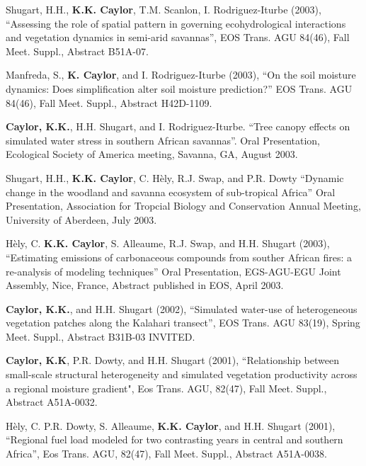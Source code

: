 \documentclass[10pt]{report}
\begin{document}
\begin{etaremune}
\item Shugart, H.H., \textbf{K.K. Caylor}, T.M. Scanlon, I. Rodriguez-Iturbe (2003),  ``Assessing the role of spatial pattern in governing ecohydrological interactions and vegetation dynamics in semi-arid savannas'', EOS Trans. AGU 84(46), Fall Meet. Suppl., Abstract B51A-07.

\item Manfreda, S., \textbf{K. Caylor}, and I. Rodriguez-Iturbe (2003), ``On the soil moisture dynamics: Does simplification alter soil moisture prediction?'' EOS Trans. AGU 84(46), Fall Meet. Suppl., Abstract H42D-1109.

\item \textbf{Caylor, K.K.}, H.H. Shugart, and I. Rodriguez-Iturbe. ``Tree canopy effects on simulated water stress in southern African savannas''. Oral Presentation, Ecological Society of America meeting, Savanna, GA, August 2003.

\item Shugart, H.H., \textbf{K.K. Caylor}, C. H\`ely, R.J. Swap, and P.R. Dowty ``Dynamic change in the woodland and savanna ecosystem of sub-tropical Africa'' Oral Presentation, Association for Tropcial Biology and Conservation Annual Meeting, University of Aberdeen, July 2003.

\item H\`ely, C. \textbf{K.K. Caylor}, S. Alleaume, R.J. Swap, and H.H. Shugart (2003), ``Estimating emissions of carbonaceous compounds from souther African fires: a re-analysis of modeling techniques'' Oral Presentation, EGS-AGU-EGU Joint Assembly, Nice, France, Abstract published in EOS, April 2003.

\item \textbf{Caylor, K.K.}, and H.H. Shugart (2002), ``Simulated water-use of heterogeneous vegetation patches along the Kalahari transect'', EOS Trans. AGU 83(19), Spring Meet. Suppl., Abstract B31B-03 INVITED.

\item \textbf{Caylor, K.K}, P.R. Dowty, and H.H. Shugart (2001), ``Relationship between small-scale structural heterogeneity and simulated vegetation productivity across a regional moisture gradient", Eos Trans. AGU, 82(47), Fall Meet. Suppl., Abstract A51A-0032.

\item H\`ely, C. P.R. Dowty, S. Alleaume, \textbf{K.K. Caylor}, and H.H. Shugart (2001), ``Regional fuel load modeled for two contrasting years in central and southern Africa'', Eos Trans. AGU, 82(47), Fall Meet. Suppl., Abstract A51A-0038.


\end{etaremune}
\end{document}
